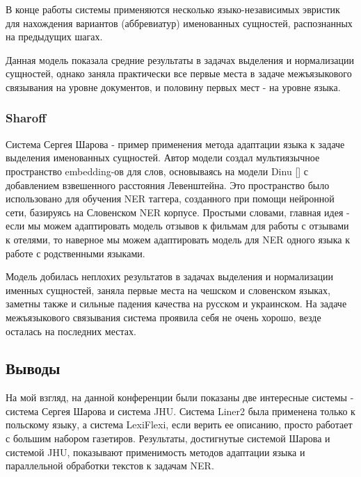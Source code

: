 В конце работы системы применяются несколько языко-независимых эвристик для нахождения вариантов (аббревиатур) именованных сущностей, распознанных на предыдущих шагах.

Данная модель показала средние результаты в задачах выделения и нормализации сущностей, однако заняла практически все первые места в задаче межъязыкового связывания на уровне документов, и половину первых мест - на уровне языка.

\subsubsection{Sharoff}

Система Сергея Шарова - пример применения метода адаптации языка к задаче выделения именованных сущностей. Автор модели создал мультиязычное пространство embedding-ов для слов, основываясь на модели Dinu [] с добавлением взвешенного расстояния Левенштейна. Это пространство было использовано для обучения NER таггера, созданного при помощи нейронной сети, базируясь на Словенском NER корпусе. Простыми словами, главная идея - если мы можем адаптировать модель отзывов к фильмам для работы с отзывами к отелями, то наверное мы можем адаптировать модель для NER одного языка к работе с родственными языками.

Модель добилась неплохих результатов в задачах выделения и нормализации именных сущностей, заняла первые места на чешском и словенском языках, заметны также и сильные падения качества на русском и украинском. На задаче межъязыкового связывания система проявила себя не очень хорошо, везде осталась на последних местах. 

\subsection{Выводы}

На мой взгляд, на данной конференции были показаны две интересные системы - система Сергея Шарова и система JHU. Система Liner2 была применена только к польскому языку, а система LexiFlexi, если верить ее описанию, просто работает с большим набором газетиров. Результаты, достигнутые системой Шарова и системой JHU, показывают применимость методов адаптации языка и параллельной обработки текстов к задачам NER.